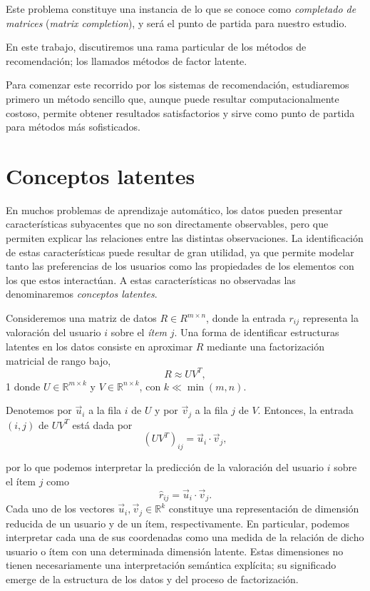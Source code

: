 Este problema constituye una instancia de lo que se conoce como \textit{completado de matrices} (\textit{matrix completion}), y será el punto de partida para nuestro estudio.

En este trabajo, discutiremos una rama particular de los métodos de recomendación; los llamados métodos de factor latente.

Para comenzar este recorrido por los sistemas de recomendación, estudiaremos primero un método sencillo que, aunque puede resultar computacionalmente costoso, permite obtener resultados satisfactorios y sirve como punto de partida para métodos más sofisticados.

\chapter{Conceptos latentes}

En muchos problemas de aprendizaje automático, los datos pueden presentar características subyacentes que no son directamente observables, pero que permiten explicar las relaciones entre las distintas observaciones. La identificación de estas características puede resultar de gran utilidad, ya que permite modelar tanto las preferencias de los usuarios como las propiedades de los elementos con los que estos interactúan. A estas características no observadas las denominaremos \textit{conceptos latentes}.

Consideremos una matriz de datos $R \in {R}^{m\times n}$, donde la entrada $r_{ij}$ representa la valoración del usuario $i$ sobre el \textit{ítem} $j$. Una forma de identificar estructuras latentes en los datos consiste en aproximar $R$ mediante una factorización matricial de rango bajo,
$$ R\approx UV^T,$$
1 donde $U\in \mathbb{R}^{m\times k}$ y $V\in  \mathbb {R}^{n\times k}$, con $k\ll\min(m,n)$.

Denotemos por $\vec{u}_i$ a la fila $i$ de $U$ y por $\vec{v}_j$ a la fila $j$ de $V$. Entonces, la entrada $(i,j)$ de $UV^T$ está dada por
$$(UV^T)_{ij} = \vec{u}_i\cdot\vec{v}_j,$$

por lo que podemos interpretar la predicción de la valoración del usuario $i$ sobre el ítem $j$ como
$$ \hat r_{ij} = \vec{u}_i\cdot\vec{v}_j. $$
Cada uno de los vectores $\vec{u}_i,\vec{v}_j\in  \mathbb{R}^{k}$ constituye una representación de dimensión reducida de un usuario y de un ítem, respectivamente. En particular, podemos interpretar cada una de sus coordenadas como una medida de la relación de dicho usuario o ítem con una determinada dimensión latente. Estas dimensiones no tienen necesariamente una interpretación semántica explícita; su significado emerge de la estructura de los datos y del proceso de factorización.

